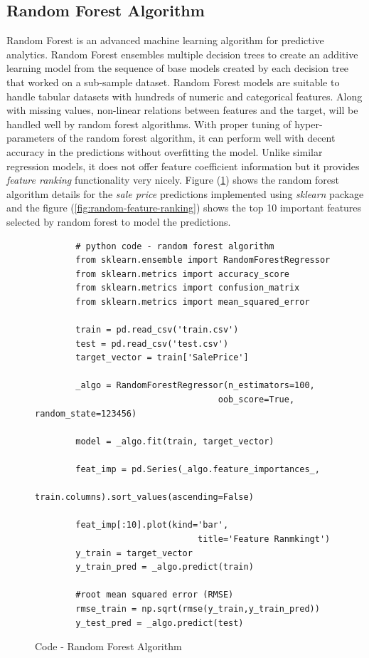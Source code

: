 \documentclass[sigconf]{acmart}
\begin{document}
	\subsection{Random Forest Algorithm}

    Random Forest is an advanced machine learning algorithm for predictive analytics. Random Forest ensembles multiple decision trees to create an additive learning model from the sequence of base models created by each decision tree that worked on a sub-sample dataset. Random Forest models are suitable to handle tabular datasets with hundreds of numeric and categorical features. Along with missing values, non-linear relations between features and the target, will be handled well by random forest algorithms. With proper tuning of hyper-parameters of the random forest algorithm, it can perform well with decent accuracy in the predictions without overfitting the model. Unlike similar regression models, it does not offer feature coefficient information but it provides {\em feature ranking} functionality very nicely. Figure (\ref{c:rf}) shows the random forest algorithm details for the {\em sale price} predictions implemented using {\em sklearn} package and the figure (\ref{fig:random-feature-ranking}) shows the top 10 important features selected by random forest to model the predictions.
	
		\begin{figure}[htb]
		\begin{verbatim}		
		# python code - random forest algorithm
		from sklearn.ensemble import RandomForestRegressor
		from sklearn.metrics import accuracy_score
		from sklearn.metrics import confusion_matrix
		from sklearn.metrics import mean_squared_error
		
		train = pd.read_csv('train.csv')
		test = pd.read_csv('test.csv')
		target_vector = train['SalePrice']
		
		_algo = RandomForestRegressor(n_estimators=100, 
									oob_score=True, random_state=123456)
		
		model = _algo.fit(train, target_vector)  
		
		feat_imp = pd.Series(_algo.feature_importances_, 
							train.columns).sort_values(ascending=False)
							
		feat_imp[:10].plot(kind='bar', 
								title='Feature Ranmkingt')		
		y_train = target_vector
		y_train_pred = _algo.predict(train)
		
		#root mean squared error (RMSE)
		rmse_train = np.sqrt(rmse(y_train,y_train_pred))			
		y_test_pred = _algo.predict(test)		
		\end{verbatim}
		\caption{Code - Random Forest Algorithm} \label{c:rf} 
		\end{figure}
\end{document}

